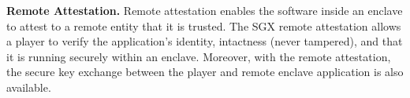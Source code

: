 \vspace{1mm}\noindent\textbf{Remote Attestation.}
Remote attestation enables the software inside an  enclave to attest to a remote entity that it is trusted.
The SGX remote attestation allows a player to verify the application's identity, intactness (never tampered), and that it is running securely within an enclave.
Moreover, with the remote attestation, the secure key exchange between the player and remote enclave application is also available.%


